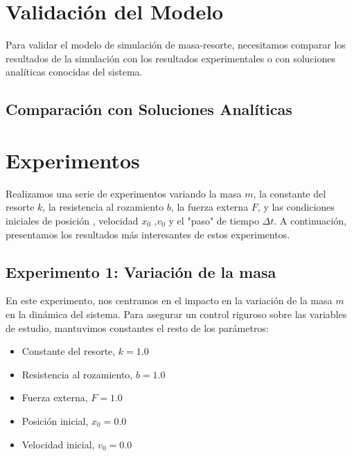 \documentclass{article}
\begin{document}
\section{Validación del Modelo}
Para validar el modelo de simulación de masa-resorte, necesitamos comparar los resultados de la simulación con los resultados experimentales o con soluciones analíticas conocidas del sistema.

\subsection{Comparación con Soluciones Analíticas}


\section{Experimentos}
Realizamos una serie de experimentos variando la masa $m$, la constante del resorte $k$, la resistencia al rozamiento $b$, la fuerza externa $F$, y las condiciones iniciales de posición  , velocidad $x_0$ ,$v_0$ y el "paso" de tiempo $\Delta t$. A continuación, presentamos los resultados más interesantes de estos experimentos.

\subsection{Experimento 1: Variación de la masa}
En este experimento, nos centramos en el impacto en  la variación de la masa $m$ en la dinámica del sistema. Para asegurar un control riguroso sobre las variables de estudio, mantuvimos constantes el resto de los parámetros:

\begin{itemize}
\item Constante del resorte, $k = 1.0$
\item Resistencia al rozamiento, $b = 1.0$
\item Fuerza externa, $F = 1.0$
\item Posición inicial, $x_0 = 0.0$
\item Velocidad inicial, $v_0 = 0.0$
\end{itemize}
\end{document}
